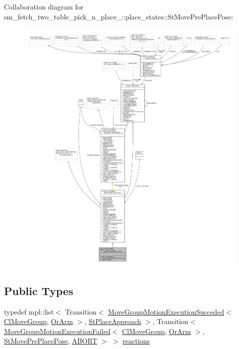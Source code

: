 Collaboration diagram for sm\+\_\+fetch\+\_\+two\+\_\+table\+\_\+pick\+\_\+n\+\_\+place\+\_\+:\+:place\+\_\+states\+:\+:St\+Move\+Pre\+Place\+Pose\+:
\nopagebreak
\begin{figure}[H]
\begin{center}
\leavevmode
\includegraphics[width=350pt]{structsm__fetch__two__table__pick__n__place__1_1_1place__states_1_1StMovePrePlacePose__coll__graph}
\end{center}
\end{figure}
\subsection*{Public Types}
\begin{DoxyCompactItemize}
\item 
typedef mpl\+::list$<$ Transition$<$ \hyperlink{structcl__move__group__interface_1_1MoveGroupMotionExecutionSucceded}{Move\+Group\+Motion\+Execution\+Succeded}$<$ \hyperlink{classcl__move__group__interface_1_1ClMoveGroup}{Cl\+Move\+Group}, \hyperlink{classsm__fetch__two__table__pick__n__place__1_1_1OrArm}{Or\+Arm} $>$, \hyperlink{structsm__fetch__two__table__pick__n__place__1_1_1place__states_1_1StPlaceApproach}{St\+Place\+Approach} $>$, Transition$<$ \hyperlink{structcl__move__group__interface_1_1MoveGroupMotionExecutionFailed}{Move\+Group\+Motion\+Execution\+Failed}$<$ \hyperlink{classcl__move__group__interface_1_1ClMoveGroup}{Cl\+Move\+Group}, \hyperlink{classsm__fetch__two__table__pick__n__place__1_1_1OrArm}{Or\+Arm} $>$, \hyperlink{structsm__fetch__two__table__pick__n__place__1_1_1place__states_1_1StMovePrePlacePose}{St\+Move\+Pre\+Place\+Pose}, \hyperlink{classABORT}{A\+B\+O\+RT} $>$ $>$ \hyperlink{structsm__fetch__two__table__pick__n__place__1_1_1place__states_1_1StMovePrePlacePose_a2a4985599c9940dae301751fd67a2bf0}{reactions}
\end{DoxyCompactItemize}
